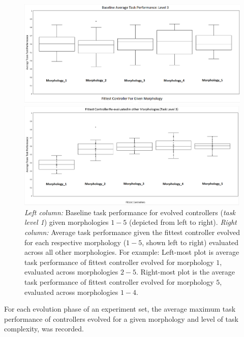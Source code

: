 \begin{figure}[t]
	\begin{minipage}{0.5\textwidth}
		\includegraphics[width=\textwidth]{Figures/Results/Baseline Calc Phase/Baseline_Level_3.png}
	\end{minipage}
	\begin{minipage}{0.5\textwidth}
		\includegraphics[width=\textwidth]{Figures/Results/Evaluation Phase/Average_Eval_Level_3.png}
	\end{minipage}
\caption{\textit{Left column:} Baseline task performance for evolved controllers (\textit{task level 1})
given morphologies $1-5$ (depicted from left to right).
\textit{Right column:} Average task performance given the fittest controller evolved
for each respective morphology ($1-5$, shown left to right) evaluated across all other morphologies.
For example: Left-most plot is average task performance of fittest controller evolved for
morphology $1$, evaluated across morphologies $2-5$.  Right-most plot is the average task performance
of fittest controller evolved for morphology $5$, evaluated across morphologies $1-4$.}\label{fig:level3results}
\end{figure}


For each evolution phase of an experiment set, the average maximum task performance
of controllers evolved for a given morphology and level of task complexity, was recorded.

